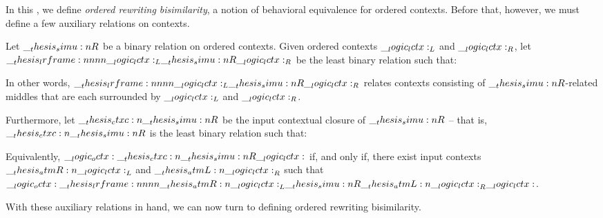 In this , we define \emph{ordered rewriting bisimilarity}, a notion of behavioral equivalence for ordered contexts.
Before that, however, we must define a few auxiliary relations on contexts.
%
\begin{definition}\label{def:ordered-bisimilarity:framed-relation}
  Let $\__thesis_simu:n {R}$ be a binary relation on ordered contexts.
  Given ordered contexts $\__logic_lctx:_L$ and $\__logic_lctx:_R$, let $\lrframe{\lctx_L}{\simu{R}}{\lctx_R}$ be the least binary relation such that:
  \begin{inferences}
  \end{inferences}
  In other words, $\lrframe{\lctx_L}{\simu{R}}{\lctx_R}$ relates contexts consisting of $\__thesis_simu:n {R}$-related middles that are each surrounded by $\__logic_lctx:_L$ and $\__logic_lctx:_R$.

  Furthermore, let $\ctxc{\simu{R}}$ be the input contextual closure of $\__thesis_simu:n {R}$ -- that is, $\ctxc{\simu{R}}$ is the least binary relation such that:
  Equivalently, $\octx \ctxc{\simu{R}} \lctx$ if, and only if, there exist input contexts $\__thesis_atmR:n {\__logic_lctx:}_L$ and $\__thesis_atmL:n {\__logic_lctx:}_R$ such that $\octx \lrframe{\atmR{\lctx}_L}{\simu{R}}{\atmL{\lctx}_R} \lctx$.
\end{definition}
\noindent
With these auxiliary relations in hand, we can now turn to defining ordered rewriting bisimilarity.

